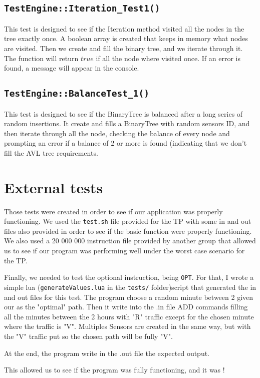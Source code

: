 \documentclass[10pt]{article}
\begin{document}
\subsection{\tt TestEngine::Iteration\_Test1()}
This test is designed to see if the Iteration method visited all the nodes in the tree exactly once. A boolean array is created that keeps in memory what nodes are visited. Then we create and fill the binary tree, and we iterate through it. The function will return $true$ if all the node where visited once. If an error is found, a message will appear in the console.

\subsection{\tt TestEngine::BalanceTest\_1()}
This test is designed to see if the BinaryTree is balanced after a long series of random insertions. It create and fills a BinaryTree with random sensors ID, and then iterate through all the node, checking the balance of every node and prompting an error if a balance of 2 or more is found (indicating that we don't fill the AVL tree requirements.

\section{External tests}
Those tests were created in order to see if our application was properly functioning. We used the \texttt{test.sh} file provided for the TP with some in and out files also provided in order to see if the basic function were properly functioning. We also used a 20 000 000 instruction file provided by another group that allowed us to see if our program was performing well under the worst case scenario for the TP.

Finally, we needed to test the optional instruction, being \texttt{OPT}. For that, I wrote a simple lua (\texttt{generateValues.lua} in the \texttt{tests/} folder)script that generated the in and out files for this test. The program choose a random minute between 2 given our as the "optimal" path. Then it write into the .in file ADD commands filling all the minutes between the 2 hours with "R" traffic except for the chosen minute where the traffic is "V". Multiples Sensors are created in the same way, but with the "V" traffic put so the chosen path will be fully "V".

At the end, the program write in the .out file the expected output.

This allowed us to see if the program was fully functioning, and it was !
\end{document}
